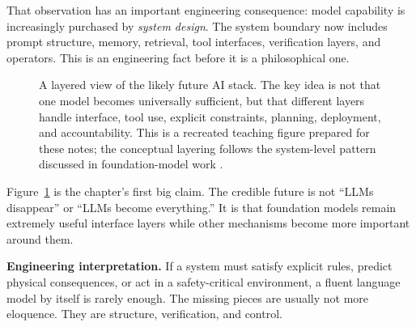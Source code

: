 \documentclass[12pt]{article}
\begin{document}
That observation has an important engineering consequence: model capability is increasingly purchased by \emph{system design}. The system boundary now includes prompt structure, memory, retrieval, tool interfaces, verification layers, and operators. This is an engineering fact before it is a philosophical one.

\begin{figure}[ht]
    \centering
    \caption{A layered view of the likely future AI stack. The key idea is not that one model becomes universally sufficient, but that different layers handle interface, tool use, explicit constraints, planning, deployment, and accountability. This is a recreated teaching figure prepared for these notes; the conceptual layering follows the system-level pattern discussed in foundation-model work \cite{bommasani2021foundation}.}
    \label{t18fig:layered_stack}
\end{figure}

Figure~\ref{t18fig:layered_stack} is the chapter's first big claim. The credible future is not ``LLMs disappear'' or ``LLMs become everything.'' It is that foundation models remain extremely useful interface layers while other mechanisms become more important around them.

\begin{alert-box}
\textbf{Engineering interpretation.} If a system must satisfy explicit rules, predict physical consequences, or act in a safety-critical environment, a fluent language model by itself is rarely enough. The missing pieces are usually not more eloquence. They are structure, verification, and control.
\end{alert-box}
\end{document}

